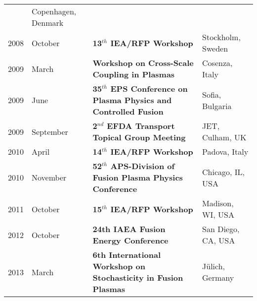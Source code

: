 {\begin{longtable}{llll}
& Copenhagen, Denmark \\
2008 & October & \textbf{13$^{th}$ IEA/RFP Workshop} & Stockholm,
Sweden \\
2009 & March & \textbf{Workshop on Cross-Scale Coupling in Plasmas} &
Cosenza, Italy  \\
2009 & June & \textbf{35$^{th}$ EPS Conference on Plasma Physics and
  Controlled Fusion} & Sofia, Bulgaria \\
2009 & September & \textbf{2$^{nd}$ EFDA Transport Topical Group
  Meeting} & JET, Culham, UK \\
2010 & April & \textbf{14$^{th}$ IEA/RFP Workshop} & Padova, Italy \\
2010 & November & \textbf{52$^{th}$ APS-Division of Fusion Plasma
  Physics Conference} & Chicago, IL, USA \\
2011 & October & \textbf{15$^{th}$ IEA/RFP Workshop} & Madison, WI,
USA \\
2012 & October & \textbf{24th IAEA Fusion Energy Conference} & San
Diego, CA, USA\\
2013 & March & \textbf{6th International Workshop on Stochasticity in
  Fusion Plasmas} & J{\"u}lich, Germany
\end{longtable}
}
